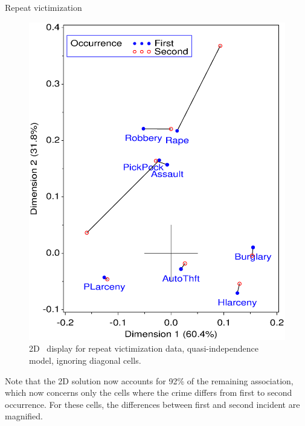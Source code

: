 \begin{Example}[victims3]{Repeat victimization}
\begin{figure}[htb]
  \centering
  \includegraphics[scale=.6,clip]{ch5/fig/corresp5b}
  \caption[Repeat victimization data, quasi-independence
  model]{2D \CA\ display for repeat victimization data, quasi-independence
  model, ignoring diagonal cells.}%
  \label{fig:corresp5b}
\end{figure}
Note that the 2D solution now accounts for 92\% of the remaining
association, which now concerns only the cells where the crime differs
from first to second occurrence.
For these cells, the differences between first and second incident are
magnified.
\end{Example}
